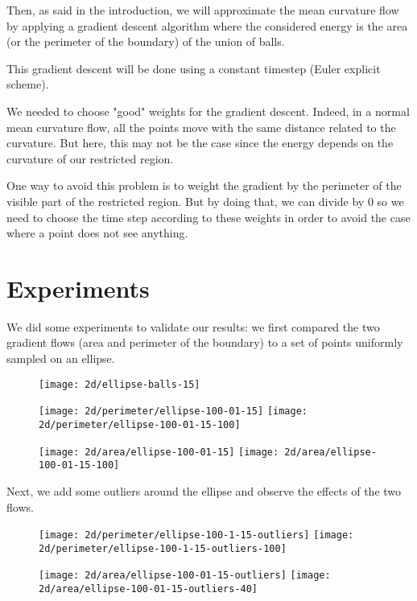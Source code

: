 Then, as said in the introduction, we will approximate the mean curvature flow
by applying a gradient descent algorithm where the considered energy is the area
(or the perimeter of the boundary) of the union of balls.

This gradient descent will be done using a constant timestep (Euler explicit
scheme).

We needed to choose "good" weights for the gradient descent. Indeed, in a normal
mean curvature flow, all the points move with the same distance related to the
curvature. But here, this may not be the case since the energy depends on the
curvature of our restricted region.

One way to avoid this problem is to weight the gradient by the perimeter of the
visible part of the restricted region. But by doing that, we can divide by $ 0 $
so we need to choose the time step according to these weights in order to avoid
the case where a point does not see anything.


\section{Experiments}

We did some experiments to validate our results: we first compared the two
gradient flows (area and perimeter of the boundary) to a set of points uniformly
sampled on an ellipse.

\begin{figure}[H]
    \centering

    \texttt{[image: 2d/ellipse-balls-15]}

    \texttt{[image: 2d/perimeter/ellipse-100-01-15]}
    \texttt{[image: 2d/perimeter/ellipse-100-01-15-100]}
    \label{fig:ellipse_perimeter_flow}

    \texttt{[image: 2d/area/ellipse-100-01-15]}
    \texttt{[image: 2d/area/ellipse-100-01-15-100]}
    \label{fig:ellipse_area_flow}
\end{figure}

Next, we add some outliers around the ellipse and observe the effects of the two
flows.

\begin{figure}[H]
    \centering

    \texttt{[image: 2d/perimeter/ellipse-100-1-15-outliers]}
    \texttt{[image: 2d/perimeter/ellipse-100-1-15-outliers-100]}
    \label{fig:ellipse_outliers_perimeter_flow}

    \texttt{[image: 2d/area/ellipse-100-01-15-outliers]}
    \texttt{[image: 2d/area/ellipse-100-01-15-outliers-40]}
    \label{fig:ellipse_outliers_area_flow}
\end{figure}


